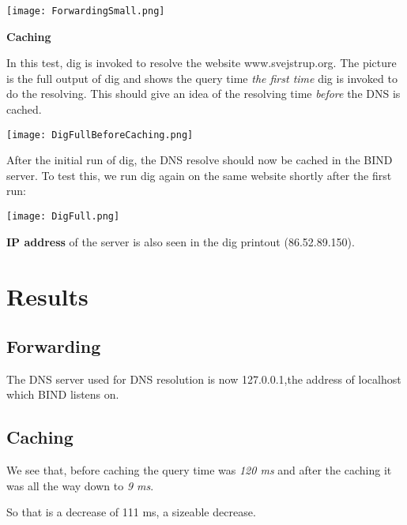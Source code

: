 \begin{center}
	\texttt{[image: ForwardingSmall.png]}
\end{center}

\textbf{Caching}

In this test, dig is invoked to resolve the website www.svejstrup.org.
The picture is the full output of dig and shows the query time \textit{the first time} dig is invoked to do the resolving. This should give an idea of the resolving time \textit{before} the DNS is cached.

\begin{center}
	\texttt{[image: DigFullBeforeCaching.png]}
\end{center}

After the initial run of dig, the DNS resolve should now be cached in the BIND server. To test this, we run dig again on the same website shortly after the first run:

\begin{center}
	\texttt{[image: DigFull.png]}
\end{center}

\textbf{IP address}
of the server is also seen in the dig printout (86.52.89.150).

\section{Results}
\subsection{Forwarding}
The DNS server used for DNS resolution is now 127.0.0.1,the address of localhost which BIND listens on.

\subsection{Caching}
We see that, before caching the query time was \textit{120 ms} and after the caching it was all the way down to \textit{9 ms}.

So that is a decrease of 111 ms, a sizeable decrease.



